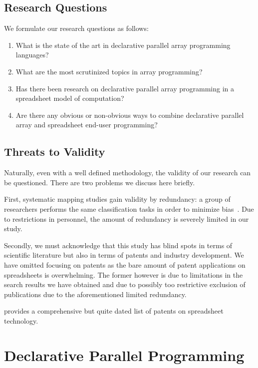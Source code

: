 \documentclass[a4paper]{article}
\begin{document}
\subsection{Research Questions}
\label{sec:research-questions}

We formulate our research questions as follows:

\begin{enumerate}
\item What is the state of the art in declarative parallel array programming languages?
\item What are the most scrutinized topics in array programming?
\item Has there been research on declarative parallel array programming in a spreadsheet model of computation?
\item Are there any obvious or non-obvious ways to combine declarative parallel array and spreadsheet end-user programming?
\end{enumerate}

\subsection{Threats to Validity}
\label{sec:threats-validity}

Naturally, even with a well defined methodology, the validity of our research can be questioned. There are two problems we discuss here briefly.

First, systematic mapping studies gain validity by redundancy: a group of researchers performs the same classification tasks in order to minimize bias~\cite{keele2007guidelines}. Due to restrictions in personnel, the amount of redundancy is severely limited in our study.

Secondly, we must acknowledge that this study has blind spots in terms of scientific literature but also in terms of patents and industry development. We have omitted focusing on patents as the bare amount of patent applications on spreadsheets is overwhelming. The former however is due to limitations in the search results we have obtained and due to possibly too restrictive exclusion of publications due to the aforementioned limited redundancy.

\citet{Sestoft2006Spreadsheet} provides a comprehensive but quite dated list of patents on spreadsheet technology.

\section{Declarative Parallel Programming}
\label{sec:declarative-parallel-programming}
\end{document}
